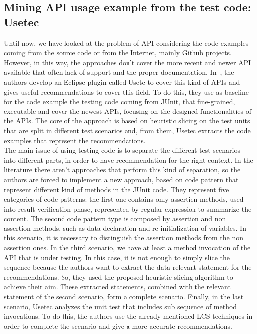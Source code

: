 \subsection{Mining API usage example from the test code: Usetec}
Until now, we have looked at the problem of API considering the code examples coming from the source code or from the Internet, mainly Github projects. However, in this way, the approaches don't cover the more recent and newer API available that often lack of support and the proper documentation. In~\cite{zhu_mining_2014}, the authors develop an Eclipse plugin called Usetc to cover this kind of APIs and gives useful recommendations to cover this field. To do this, they use as baseline for the code example the testing code coming from JUnit, that fine-grained, executable and cover the newest APIs, focusing on the designed functionalities of the APIs. The core of the approach is based on heuristic slicing on the test units that are split in different test scenarios and, from them, Usetec extracts the code examples that represent the recommendations. \\
The main issue of using testing code is to separate the different test scenarios into different parts, in order to have recommendation for the right context. In the literature there aren't approaches that perform this kind of separation, so the authors are forced to implement a new approach, based on code pattern that represent different kind of methods in the JUnit code. They represent five categories of code patterns: the first one contains only assertion methods, used into result verification phase, represented by regular expression to summarize the content. The second code pattern type is composed by assertion and non assertion methods, such as data declaration and re-initialization of variables. In this scenario, it is necessary to distinguish the assertion methods from the non assertion ones. In the third scenario, we have at least a method invocation of the API that is under testing. In this case, it is not enough to simply slice the sequence because the authors want to extract the data-relevant statement for the recommendations. So, they used the proposed heuristic slicing algorithm to achieve their aim. These extracted statements, combined with the relevant statement of the second scenario, form a complete scenario. Finally, in the last scenario, Usetec analyzes the unit test that includes sub sequence of method invocations. To do this, the authors use the already mentioned LCS techniques in order to complete the scenario and give a more accurate recommendations. \newline
